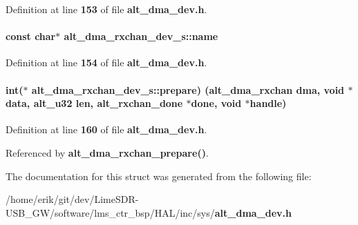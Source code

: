 Definition at line {\bf 153} of file {\bf alt\+\_\+dma\+\_\+dev.\+h}.

\paragraph[{name}]{\setlength{\rightskip}{0pt plus 5cm}const char$\ast$ alt\+\_\+dma\+\_\+rxchan\+\_\+dev\+\_\+s\+::name}\label{structalt__dma__rxchan__dev__s_a33ab1a832a538b1a534b3ff9e95c91bc}


Definition at line {\bf 154} of file {\bf alt\+\_\+dma\+\_\+dev.\+h}.

\paragraph[{prepare}]{\setlength{\rightskip}{0pt plus 5cm}int($\ast$ alt\+\_\+dma\+\_\+rxchan\+\_\+dev\+\_\+s\+::prepare) ({\bf alt\+\_\+dma\+\_\+rxchan} dma, void $\ast${\bf data}, {\bf alt\+\_\+u32} len, {\bf alt\+\_\+rxchan\+\_\+done} $\ast$done, void $\ast$handle)}\label{structalt__dma__rxchan__dev__s_abb6a1e36c34113c8cfb4a1eb11634c51}


Definition at line {\bf 160} of file {\bf alt\+\_\+dma\+\_\+dev.\+h}.



Referenced by {\bf alt\+\_\+dma\+\_\+rxchan\+\_\+prepare()}.



The documentation for this struct was generated from the following file\+:\begin{DoxyCompactItemize}
\item 
/home/erik/git/dev/\+Lime\+S\+D\+R-\/\+U\+S\+B\+\_\+\+G\+W/software/lms\+\_\+ctr\+\_\+bsp/\+H\+A\+L/inc/sys/{\bf alt\+\_\+dma\+\_\+dev.\+h}\end{DoxyCompactItemize}
